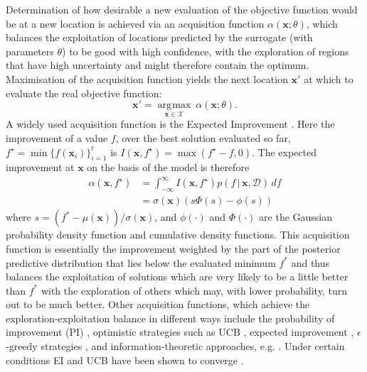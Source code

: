 \documentclass[conference]{IEEEtran}
\newcommand{\parameterspace}{\mathcal{X}}
\DeclareMathOperator*{\argmax}{\arg\!\max}
\newcommand\ei{EI\xspace}
\newcommand{\given}{\,|\,}
\newcommand{\bx}{\mathbf{x}}
\newcommand{\data}{\mathcal{D}}
\begin{document}
Determination of how desirable a new evaluation of the objective function
would be at a new location is achieved via an acquisition function $\alpha(\mathbf{x};  \theta)$, which balances the exploitation of locations predicted by the surrogate (with parameters $\theta$) to be good with high confidence, with the exploration of regions that have high uncertainty and might therefore contain the optimum. Maximisation of the acquisition function 
yields the next location $\bx'$ at which to evaluate the real objective function: 
\begin{equation}\label{eqn: argmax_alpha}
   \bx' = \underset{\mathbf{x} \in \parameterspace}{\argmax}\:\alpha(\mathbf{x};  \theta).
 \end{equation}
A widely used acquisition function is the Expected Improvement
\cite{jones1998efficient}.  Here the improvement of a value $f$, over the best solution
evaluated so far, $f^\star = \min \{f(\bx_i)\}_{i=1}^t$ is $I(\bx,
 f^\star) = \max(f^\star -f, 0)$.  The expected improvement at $\bx$ on the basis of
the model is therefore
  \begin{align}
   \label{eq:EI}
    \alpha(\bx, f^\star) &= \int_{-\infty}^\infty  I(\bx, f^\star) p(f \given \bx, \data)\,df \\
   &= \sigma(\bx) \left( s\Phi( s) - \phi (s)\right) \label{eq:ei-closed-form}
  \end{align}
 where $s = (f^* - \mu(\bx)) / \sigma(\bx)$, and $\phi(\cdot)$ and
 $\Phi(\cdot)$ are the Gaussian probability density function and cumulative
 density functions. This acquisition function is essentially the improvement
 weighted by the part of the posterior predictive distribution that lies
 below the evaluated minimum $f^*$ and thus balances the exploitation of
 solutions which are very likely to be a little better than $f^*$ with the
 exploration of others which may, with lower probability, turn out to be
 much better. Other acquisition functions, which achieve the
 exploration-exploitation balance in different ways include the probability
 of improvement (PI) \cite{kushner:ego}, optimistic strategies such as UCB
 \cite{srinivas:ucb:2010}, expected improvement \cite{jones1998efficient},
 $\epsilon$-greedy strategies \cite{bull2011convergence, death2019greed},
 and information-theoretic approaches, e.g. \cite{scott:kg:2011,
   ru:fitbo:2018}.  Under certain conditions \ei and UCB have been shown to converge
\cite{bull2011convergence, srinivas:ucb:2010}.
\end{document}

